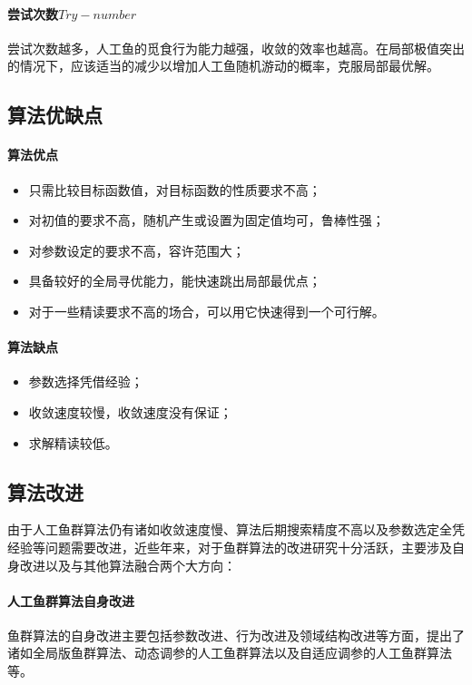 \documentclass[UTF8]{ctexart}
\begin{document}
			\paragraph{尝试次数$Try-number$}尝试次数越多，人工鱼的觅食行为能力越强，收敛的效率也越高。在局部极值突出的情况下，应该适当的减少以增加人工鱼随机游动的概率，克服局部最优解。
		\subsection{算法优缺点}
			\paragraph{算法优点}
				\begin{itemize}
					\item 只需比较目标函数值，对目标函数的性质要求不高；
                				\item 对初值的要求不高，随机产生或设置为固定值均可，鲁棒性强；
                				\item 对参数设定的要求不高，容许范围大；
                				\item 具备较好的全局寻优能力，能快速跳出局部最优点；
                				\item 对于一些精读要求不高的场合，可以用它快速得到一个可行解。
				\end{itemize}
			\paragraph{算法缺点}
				\begin{itemize}
					\item 参数选择凭借经验；
					\item 收敛速度较慢，收敛速度没有保证；
                				\item 求解精读较低。
				\end{itemize}
		\subsection{算法改进}
			由于人工鱼群算法仍有诸如收敛速度慢、算法后期搜索精度不高以及参数选定全凭经验等问题需要改进，近些年来，对于鱼群算法的改进研究十分活跃，主要涉及自身改进以及与其他算法融合两个大方向：
			\paragraph{人工鱼群算法自身改进}
				鱼群算法的自身改进主要包括参数改进、行为改进及领域结构改进等方面，提出了诸如全局版鱼群算法、动态调参的人工鱼群算法以及自适应调参的人工鱼群算法等。
\end{document}

